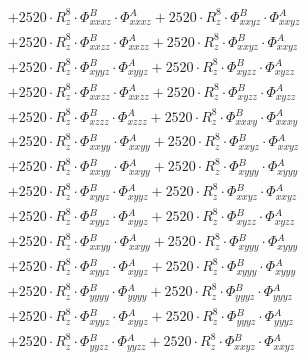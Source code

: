 \documentclass{article}
\begin{document}
\begin{subequations}
\begin{gather}
\begin{array}{c}
 \\[0.2em] 		 + 2520 \cdot R_{z}^{8} \cdot \Phi{}^{B}_{xxxz} \cdot \Phi{}^{A}_{xxxz}+ 2520 \cdot R_{z}^{8} \cdot \Phi{}^{B}_{xxyz} \cdot \Phi{}^{A}_{xxyz} 
 \\[0.2em] 		 + 2520 \cdot R_{z}^{8} \cdot \Phi{}^{B}_{xxzz} \cdot \Phi{}^{A}_{xxzz}+ 2520 \cdot R_{z}^{8} \cdot \Phi{}^{B}_{xxyz} \cdot \Phi{}^{A}_{xxyz} 
 \\[0.2em] 		 + 2520 \cdot R_{z}^{8} \cdot \Phi{}^{B}_{xyyz} \cdot \Phi{}^{A}_{xyyz}+ 2520 \cdot R_{z}^{8} \cdot \Phi{}^{B}_{xyzz} \cdot \Phi{}^{A}_{xyzz} 
 \\[0.2em] 		 + 2520 \cdot R_{z}^{8} \cdot \Phi{}^{B}_{xxzz} \cdot \Phi{}^{A}_{xxzz}+ 2520 \cdot R_{z}^{8} \cdot \Phi{}^{B}_{xyzz} \cdot \Phi{}^{A}_{xyzz} 
 \\[0.2em] 		 + 2520 \cdot R_{z}^{8} \cdot \Phi{}^{B}_{xzzz} \cdot \Phi{}^{A}_{xzzz}+ 2520 \cdot R_{z}^{8} \cdot \Phi{}^{B}_{xxxy} \cdot \Phi{}^{A}_{xxxy} 
 \\[0.2em] 		 + 2520 \cdot R_{z}^{8} \cdot \Phi{}^{B}_{xxyy} \cdot \Phi{}^{A}_{xxyy}+ 2520 \cdot R_{z}^{8} \cdot \Phi{}^{B}_{xxyz} \cdot \Phi{}^{A}_{xxyz} 
 \\[0.2em] 		 + 2520 \cdot R_{z}^{8} \cdot \Phi{}^{B}_{xxyy} \cdot \Phi{}^{A}_{xxyy}+ 2520 \cdot R_{z}^{8} \cdot \Phi{}^{B}_{xyyy} \cdot \Phi{}^{A}_{xyyy} 
 \\[0.2em] 		 + 2520 \cdot R_{z}^{8} \cdot \Phi{}^{B}_{xyyz} \cdot \Phi{}^{A}_{xyyz}+ 2520 \cdot R_{z}^{8} \cdot \Phi{}^{B}_{xxyz} \cdot \Phi{}^{A}_{xxyz} 
 \\[0.2em] 		 + 2520 \cdot R_{z}^{8} \cdot \Phi{}^{B}_{xyyz} \cdot \Phi{}^{A}_{xyyz}+ 2520 \cdot R_{z}^{8} \cdot \Phi{}^{B}_{xyzz} \cdot \Phi{}^{A}_{xyzz} 
 \\[0.2em] 		 + 2520 \cdot R_{z}^{8} \cdot \Phi{}^{B}_{xxyy} \cdot \Phi{}^{A}_{xxyy}+ 2520 \cdot R_{z}^{8} \cdot \Phi{}^{B}_{xyyy} \cdot \Phi{}^{A}_{xyyy} 
 \\[0.2em] 		 + 2520 \cdot R_{z}^{8} \cdot \Phi{}^{B}_{xyyz} \cdot \Phi{}^{A}_{xyyz}+ 2520 \cdot R_{z}^{8} \cdot \Phi{}^{B}_{xyyy} \cdot \Phi{}^{A}_{xyyy} 
 \\[0.2em] 		 + 2520 \cdot R_{z}^{8} \cdot \Phi{}^{B}_{yyyy} \cdot \Phi{}^{A}_{yyyy}+ 2520 \cdot R_{z}^{8} \cdot \Phi{}^{B}_{yyyz} \cdot \Phi{}^{A}_{yyyz} 
 \\[0.2em] 		 + 2520 \cdot R_{z}^{8} \cdot \Phi{}^{B}_{xyyz} \cdot \Phi{}^{A}_{xyyz}+ 2520 \cdot R_{z}^{8} \cdot \Phi{}^{B}_{yyyz} \cdot \Phi{}^{A}_{yyyz} 
 \\[0.2em] 		 + 2520 \cdot R_{z}^{8} \cdot \Phi{}^{B}_{yyzz} \cdot \Phi{}^{A}_{yyzz}+ 2520 \cdot R_{z}^{8} \cdot \Phi{}^{B}_{xxyz} \cdot \Phi{}^{A}_{xxyz} 

\end{array}
\end{gather}
\end{subequations}
\end{document}
